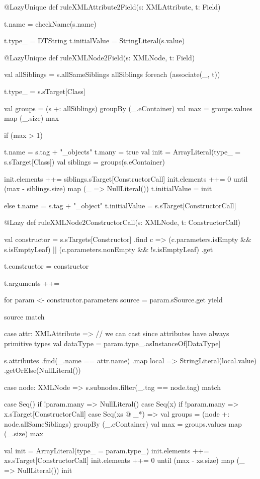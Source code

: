 \begin{scalacode}
@LazyUnique
def ruleXMLAttribute2Field(s: XMLAttribute, t: Field) {
  t.name = checkName(s.name)

  t.type_ = DTString
  t.initialValue = StringLiteral(s.value)
}
\end{scalacode}

\begin{scalacode}
@LazyUnique
def ruleXMLNode2Field(s: XMLNode, t: Field) {
  val allSiblings = s.allSameSiblings
  allSiblings foreach (associate(_, t))

  t.type_ = s.sTarget[Class]

  val groups = (s +: allSiblings) groupBy (_.eContainer)
  val max = groups.values map (_.size) max

  if (max > 1) {
    t.name = s.tag + "_objects"
    t.many = true
    val init = ArrayLiteral(type_ = s.sTarget[Class])
    val siblings = groups(s.eContainer)
    
    init.elements ++= siblings.sTarget[ConstructorCall]
    init.elements ++= 0 until (max - siblings.size) map (_ => NullLiteral())
    t.initialValue = init
  } else {
    t.name = s.tag + "_object"
    t.initialValue = s.sTarget[ConstructorCall]
  }
}  
\end{scalacode}

\begin{scalacode}
@Lazy
def ruleXMLNode2ConstructorCall(s: XMLNode, t: ConstructorCall) {
  val constructor = s.sTargets[Constructor]
    .find { c =>
      (c.parameters.isEmpty && s.isEmptyLeaf) ||
      (c.parameters.nonEmpty && !s.isEmptyLeaf)
    }
    .get

  t.constructor = constructor

  t.arguments ++= {
    for {
      param <- constructor.parameters
      source = param.sSource.get
    } yield {
      source match {
        case attr: XMLAttribute =>
          // we can cast since attributes have always primitive types
          val dataType = param.type_.asInstanceOf[DataType]

          s.attributes
            .find(_.name == attr.name)
            .map { local => StringLiteral(local.value) }
            .getOrElse(NullLiteral())

        case node: XMLNode =>
          s.subnodes.filter(_.tag == node.tag) match {

            case Seq() if !param.many =>
              NullLiteral()
            case Seq(x) if !param.many =>
              x.sTarget[ConstructorCall]
            case Seq(xs @ _*) =>
              val groups = (node +: node.allSameSiblings) groupBy (_.eContainer)
              val max = groups.values map (_.size) max
              
              val init = ArrayLiteral(type_ = param.type_)
              init.elements ++= xs.sTarget[ConstructorCall]
              init.elements ++= 0 until (max - xs.size) map (_ => NullLiteral())
              init
          }
      }
    }
  }
}
\end{scalacode}

